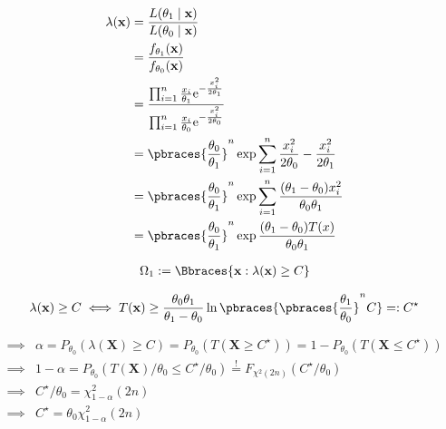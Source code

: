 \begin{solution}
\begin{enumerate}[label = (\alph*)]
    \begin{align*}
        \lambda(\mathbf x)
        & =
        \frac
        {
            L(\theta_1 \mid \mathbf x)
        }{
            L(\theta_0 \mid \mathbf x)
        } \\
        & =
        \frac
        {
            f_{\theta_1}(\mathbf x)
        }{
            f_{\theta_0}(\mathbf x)
        } \\
        & =
        \frac
        {
            \prod_{i=1}^n
                \frac{x_i}{\theta_1}
                \mathrm e^{-\frac{x_i^2}{2 \theta_1}}
        }{
            \prod_{i=1}^n
                \frac{x_i}{\theta_0}
                \mathrm e^{-\frac{x_i^2}{2 \theta_0}}
        } \\
        & =
        \pbraces{\frac{\theta_0}{\theta_1}}^n
        \exp \sum_{i=1}^n \frac{x_i^2}{2 \theta_0} - \frac{x_i^2}{2 \theta_1} \\
        & =
        \pbraces{\frac{\theta_0}{\theta_1}}^n
        \exp \sum_{i=1}^n \frac{(\theta_1 - \theta_0) x_i^2}{\theta_0 \theta_1} \\
        & =
        \pbraces{\frac{\theta_0}{\theta_1}}^n
        \exp \frac{(\theta_1 - \theta_0) T(x)}{\theta_0 \theta_1}
    \end{align*}

    \begin{align*}
        \Omega_1
        :=
        \Bbraces{\mathbf x: \lambda(\mathbf x) \geq C}
    \end{align*}

    \begin{align*}
        \lambda(\mathbf x) \geq C
        \iff
        T(\mathbf x) \geq \frac{\theta_0 \theta_1}{\theta_1 - \theta_0} \ln \pbraces{\pbraces{\frac{\theta_1}{\theta_0}}^n C} =: C^\star
    \end{align*}

    \begin{align*}
        \implies &
        \alpha = P_{\theta_0}(\lambda(\mathbf X) \geq C) = P_{\theta_0}(T(\mathbf X \geq C^\star)) = 1 - P_{\theta_0}(T(\mathbf X \leq C^\star)) \\
        \implies &
        1 - \alpha = P_{\theta_0}(T(\mathbf X) / \theta_0 \leq C^\star / \theta_0) \stackrel{!}{=} F_{\chi^2(2 n)}(C^\star / \theta_0) \\
        \implies &
        C^\star / \theta_0 = \chi^2_{1 - \alpha}(2 n) \\
        \implies &
        C^\star = \theta_0 \chi^2_{1 - \alpha}(2 n)
    \end{align*}


\end{enumerate}
\end{solution}
